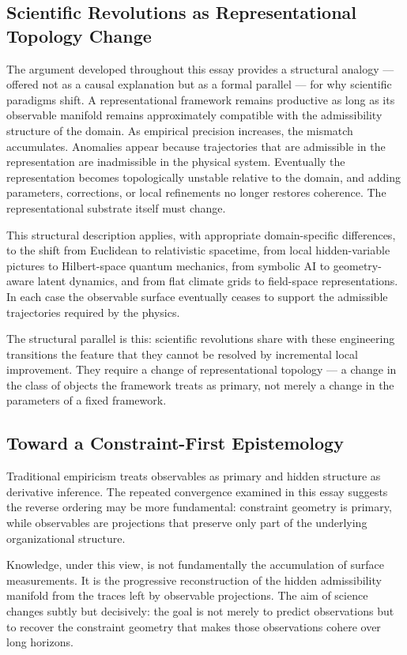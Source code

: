 \documentclass[11pt,a4paper]{article}
\theoremstyle{plain}
\theoremstyle{definition}
\theoremstyle{remark}
\begin{document}
\subsection{Scientific Revolutions as Representational Topology Change}

The argument developed throughout this essay provides a structural analogy
--- offered not as a causal explanation but as a formal parallel --- for
why scientific paradigms shift. A representational framework remains
productive as long as its observable manifold remains approximately compatible
with the admissibility structure of the domain. As empirical precision
increases, the mismatch accumulates. Anomalies appear because trajectories
that are admissible in the representation are inadmissible in the physical
system. Eventually the representation becomes topologically unstable relative
to the domain, and adding parameters, corrections, or local refinements no
longer restores coherence. The representational substrate itself must change.

This structural description applies, with appropriate domain-specific
differences, to the shift from Euclidean to relativistic spacetime, from
local hidden-variable pictures to Hilbert-space quantum mechanics, from
symbolic AI to geometry-aware latent dynamics, and from flat climate grids
to field-space representations. In each case the observable surface
eventually ceases to support the admissible trajectories required by the
physics.

The structural parallel is this: scientific revolutions share with these
engineering transitions the feature that they cannot be resolved by
incremental local improvement. They require a change of representational
topology --- a change in the class of objects the framework treats as
primary, not merely a change in the parameters of a fixed framework.

\subsection{Toward a Constraint-First Epistemology}

Traditional empiricism treats observables as primary and hidden structure
as derivative inference. The repeated convergence examined in this essay
suggests the reverse ordering may be more fundamental: constraint geometry
is primary, while observables are projections that preserve only part of
the underlying organizational structure.

Knowledge, under this view, is not fundamentally the accumulation of surface
measurements. It is the progressive reconstruction of the hidden admissibility
manifold from the traces left by observable projections. The aim of science
changes subtly but decisively: the goal is not merely to predict observations
but to recover the constraint geometry that makes those observations cohere
over long horizons.
\end{document}
